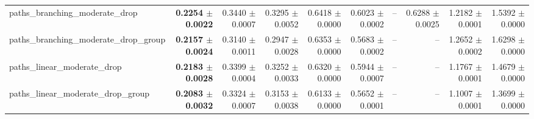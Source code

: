 \begin{tabular}{@{}lrrrrrrrrr@{}}
paths\_branching\_moderate\_drop & \textbf{0.2254 $\pm$ 0.0022} & 0.3440 $\pm$ 0.0007 & 0.3295 $\pm$ 0.0052 & 0.6418 $\pm$ 0.0000 & 0.6023 $\pm$ 0.0002 & -- & 0.6288 $\pm$ 0.0025 & 1.2182 $\pm$ 0.0001 & 1.5392 $\pm$ 0.0000 \\
paths\_branching\_moderate\_drop\_group & \textbf{0.2157 $\pm$ 0.0024} & 0.3140 $\pm$ 0.0011 & 0.2947 $\pm$ 0.0028 & 0.6353 $\pm$ 0.0000 & 0.5683 $\pm$ 0.0002 & -- & -- & 1.2652 $\pm$ 0.0002 & 1.6298 $\pm$ 0.0000 \\
paths\_linear\_moderate\_drop & \textbf{0.2183 $\pm$ 0.0028} & 0.3399 $\pm$ 0.0004 & 0.3252 $\pm$ 0.0033 & 0.6320 $\pm$ 0.0000 & 0.5944 $\pm$ 0.0007 & -- & -- & 1.1767 $\pm$ 0.0001 & 1.4679 $\pm$ 0.0000 \\
paths\_linear\_moderate\_drop\_group & \textbf{0.2083 $\pm$ 0.0032} & 0.3324 $\pm$ 0.0007 & 0.3153 $\pm$ 0.0038 & 0.6133 $\pm$ 0.0000 & 0.5652 $\pm$ 0.0001 & -- & -- & 1.1007 $\pm$ 0.0001 & 1.3699 $\pm$ 0.0000 \\
\bottomrule
\end{tabular}
